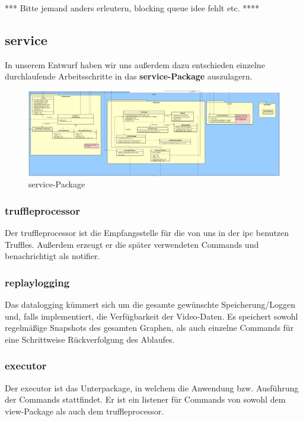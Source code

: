 *** Bitte jemand anders erleutern, blocking queue idee fehlt etc. ****


\subsection{service}


In unserem Entwurf haben wir uns außerdem dazu entschieden einzelne
durchlaufende Arbeitsschritte in das \textbf{service-Package} auszulagern.\newline

\begin{figure}[H]
  \centering
  \includegraphics[width=\textwidth]{../diagramimages/service.png}
  \caption{service-Package}
  \medskip
\end{figure}

    \subsubsection{truffleprocessor}
    \label{subsubsec:truffleprocessor}
    Der truffleprocessor ist die Empfangsstelle für die von uns in der
    \gls{ipc} benutzen Truffles. Außerdem erzeugt er die später verwendeten
    Commands und benachrichtigt als \gls{notifier}.

    \subsubsection{replaylogging}
    \label{subsubsec:replaylogging}
    Das datalogging kümmert sich um die gesamte gewünschte
    Speicherung/Loggen und, falls implementiert, die Verfügbarkeit der
    Video-Daten. Es speichert sowohl regelmäßige Snapshots des gesamten
    Graphen, als auch einzelne Commands für eine Schrittweise Rückverfolgung
    des Ablaufes.

    \subsubsection{executor}
    Der executor ist das Unterpackage, in welchem die Anwendung bzw.
    Ausführung der Commands stattfindet. Er ist ein \gls{listener} für Commands
    von sowohl dem view-Package als auch dem truffleprocessor.


